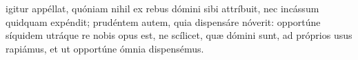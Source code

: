 \documentclass[fontsize=9pt,paper=A6,twoside,BCOR=1mm,DIV=22,headinclude]{scrarticle}
\begin{document}
\begin{multicols}{2}
\RVCPviii

 igitur appéllat, quóniam nihil ex rebus dómini sibi attríbuit, nec incássum quidquam expéndit; prudéntem autem, quia dispensáre nóverit: opportúne síquidem utráque re nobis opus est, ne scílicet, quæ dómini sunt, ad próprios usus rapiámus, et ut opportúne ómnia dispensémus.

\Te


\end{multicols}

\ornamentvi
\end{document}
